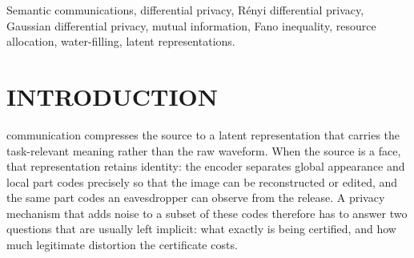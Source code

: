\documentclass{ieeetj}
\theoremstyle{plain}
\theoremstyle{definition}
\begin{document}
\begin{abstract}
Decomposed latents in semantic communication retain a subject's identity, yet
existing designs certify protection from the \emph{appearance} of the released
noise rather than from an auditable budget, and report no adversary
identification bound. We develop a framework that quantifies both. The
per-component $\ell_2$ sensitivity is isolated and correct quadrature
bookkeeping is distinguished from looser linear practices: at a low-noise
operating point, amplitude-only $\ell_1$ accounting reports
$\varepsilon\approx693$ where the rigorous Gaussian tail bound gives
$\approx2441$ and the quadrature account gives $2000$ (a Gaussian-proxy
re-pricing of a reference operating point). Two independent guarantees are
derived. A $(\varepsilon,\delta)$-DP account via R\'enyi and Gaussian DP
audits the release; a Gaussian worst-case mutual-information bound with Fano's
inequality gives an identification-error floor $\tau$ with ceiling
$\tau_{\max}(K)$. Neither implies the other. Post-processing leaves both
unchanged, so a public invertible shaping network cannot help Bob without
helping Eve. The induced budget program has a closed-form water-filling KKT
solution. On a SemanticStyleGAN calibration, $65{,}536$ prior codes fix each
block's power and sensitivity and noise sweeps fix utility weights; the
accounting ordering, its dependence on task--private overlap, and the failure
of amplitude-only accounting are reproduced. The perceptual score and attack
error remain surrogates; source statistics are a pushforward of the generator
prior, not an inversion of real identities.
\end{abstract}

\begin{IEEEkeywords}
Semantic communications, differential privacy, R\'enyi differential privacy,
Gaussian differential privacy, mutual information, Fano inequality, resource
allocation, water-filling, latent representations.
\end{IEEEkeywords}

\section{INTRODUCTION}
\label{sec:intro}

 communication compresses the source to a latent
representation that carries the task-relevant meaning rather than the raw
waveform. When the source is a face, that representation retains identity:
the encoder separates global appearance and local part codes precisely so that
the image can be reconstructed or edited, and the same part codes an eavesdropper
can observe from the release. A privacy mechanism that adds noise to a subset
of these codes therefore has to answer two questions that are usually left
implicit: what exactly is being certified, and how much legitimate distortion
the certificate costs.
\end{document}

